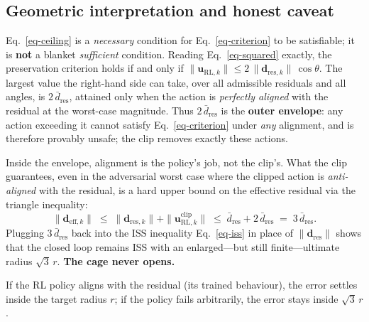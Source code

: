 \documentclass[
  11pt,
]{article}
\theoremstyle{plain}
\theoremstyle{plain}
\theoremstyle{definition}
\theoremstyle{remark}
\begin{document}
\subsection{Geometric interpretation and honest caveat}\label{sec-geom}

Eq.~\ref{eq-ceiling} is a \emph{necessary} condition for
Eq.~\ref{eq-criterion} to be satisfiable; it is \textbf{not} a blanket
\emph{sufficient} condition. Reading Eq.~\ref{eq-squared} exactly, the
preservation criterion holds if and only if
\(\|\bm{u}_{\mathrm{RL},k}\| \le 2\,\|\bm{d}_{\mathrm{res},k}\|\,\cos\theta\).
The largest value the right-hand side can take, over all admissible
residuals and all angles, is \(2\,\bar{d}_{\mathrm{res}}\), attained
only when the action is \emph{perfectly aligned} with the residual at
the worst-case magnitude. Thus \(2\,\bar{d}_{\mathrm{res}}\) is the
\textbf{outer envelope}: any action exceeding it cannot satisfy
Eq.~\ref{eq-criterion} under \emph{any} alignment, and is therefore
provably unsafe; the clip removes exactly these actions.

Inside the envelope, alignment is the policy's job, not the clip's. What
the clip guarantees, even in the adversarial worst case where the
clipped action is \emph{anti-aligned} with the residual, is a hard upper
bound on the effective residual via the triangle inequality: \[
\|\bm{d}_{\mathrm{eff},k}\|
\;\le\;
\|\bm{d}_{\mathrm{res},k}\| + \|\bm{u}_{\mathrm{RL},k}^{\mathrm{clip}}\|
\;\le\;
\bar{d}_{\mathrm{res}} + 2\,\bar{d}_{\mathrm{res}}
\;=\;
3\,\bar{d}_{\mathrm{res}}.
\] Plugging \(3\,\bar{d}_{\mathrm{res}}\) back into the ISS inequality
Eq.~\ref{eq-iss} in place of \(\|\bm{d}_{\mathrm{res}}\|\) shows that
the closed loop remains ISS with an enlarged---but still
finite---ultimate radius \(\sqrt{3}\,r\). \textbf{The cage never opens.}

\begin{tcolorbox}[enhanced jigsaw, arc=.35mm, bottomrule=.15mm, bottomtitle=1mm, breakable, colback=white, colbacktitle=quarto-callout-tip-color!10!white, colframe=quarto-callout-tip-color-frame, coltitle=black, left=2mm, leftrule=.75mm, opacityback=0, opacitybacktitle=0.6, rightrule=.15mm, title=\textcolor{quarto-callout-tip-color}{\faLightbulb}\hspace{0.5em}{What the clip guarantees, in one sentence}, titlerule=0mm, toprule=.15mm, toptitle=1mm]

If the RL policy aligns with the residual (its trained behaviour), the
error settles inside the target radius \(r\); if the policy fails
arbitrarily, the error stays inside \(\sqrt{3}\,r\).

\end{tcolorbox}
\end{document}
